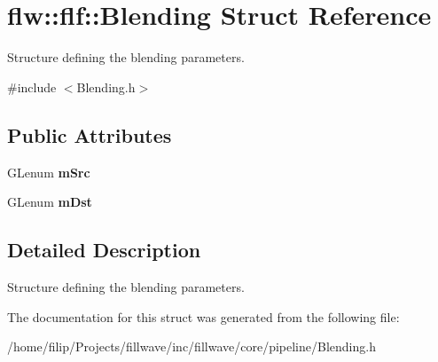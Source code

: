 \hypertarget{structflw_1_1flf_1_1Blending}{}\section{flw\+:\+:flf\+:\+:Blending Struct Reference}
\label{structflw_1_1flf_1_1Blending}


Structure defining the blending parameters.  




{\ttfamily \#include $<$Blending.\+h$>$}

\subsection*{Public Attributes}
\begin{DoxyCompactItemize}
\item 
G\+Lenum {\bfseries m\+Src}\hypertarget{structflw_1_1flf_1_1Blending_a051e5468c6f0896c3c7c284380e617f0}{}\label{structflw_1_1flf_1_1Blending_a051e5468c6f0896c3c7c284380e617f0}

\item 
G\+Lenum {\bfseries m\+Dst}\hypertarget{structflw_1_1flf_1_1Blending_a5509a580e67f5ffc8411e7be25e28fdd}{}\label{structflw_1_1flf_1_1Blending_a5509a580e67f5ffc8411e7be25e28fdd}

\end{DoxyCompactItemize}


\subsection{Detailed Description}
Structure defining the blending parameters. 

The documentation for this struct was generated from the following file\+:\begin{DoxyCompactItemize}
\item 
/home/filip/\+Projects/fillwave/inc/fillwave/core/pipeline/Blending.\+h\end{DoxyCompactItemize}
